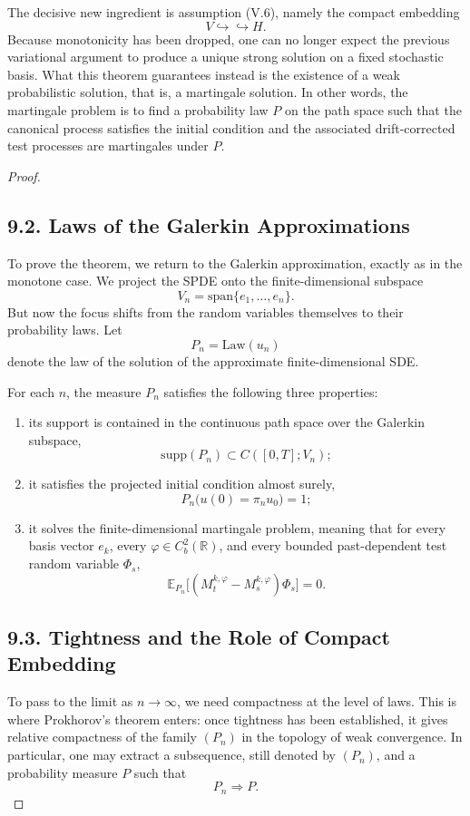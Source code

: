 \documentclass[11pt]{article}
\theoremstyle{definition}
\theoremstyle{remark}
\begin{document}
The decisive new ingredient is assumption (V.6), namely the compact embedding
\[
  V\hookrightarrow\hookrightarrow H.
\]
Because monotonicity has been dropped, one can no longer expect the previous variational argument to produce a unique strong solution on a fixed stochastic basis. What this theorem guarantees instead is the existence of a weak probabilistic solution, that is, a martingale solution.
In other words, the martingale problem is to find a probability law $P$ on the path space such that the canonical process satisfies the initial condition and the associated drift-corrected test processes are martingales under $P$.

\begin{proof}

\subsection*{9.2. Laws of the Galerkin Approximations}
To prove the theorem, we return to the Galerkin approximation, exactly as in the monotone case. We project the SPDE onto the finite-dimensional subspace
\[
  V_n=\mathrm{span}\{e_1,\dots,e_n\}.
\]
But now the focus shifts from the random variables themselves to their probability laws. Let
\[
  P_n=\mathrm{Law}(u_n)
\]
denote the law of the solution of the approximate finite-dimensional SDE.

For each $n$, the measure $P_n$ satisfies the following three properties:
\begin{enumerate}
\item its support is contained in the continuous path space over the Galerkin subspace,
\[
  \mathrm{supp}(P_n)\subset C([0,T];V_n);
\]
\item it satisfies the projected initial condition almost surely,
\[
  P_n\bigl(u(0)=\pi_n u_0\bigr)=1;
\]
\item it solves the finite-dimensional martingale problem, meaning that for every basis vector $e_k$, every $\varphi\in C_b^2(\mathbb{R})$, and every bounded past-dependent test random variable $\Phi_s$,
\[
  \mathbb E_{P_n}\bigl[(M_t^{k,\varphi}-M_s^{k,\varphi})\Phi_s\bigr]=0.
\]
\end{enumerate}

\subsection*{9.3. Tightness and the Role of Compact Embedding}
To pass to the limit as $n\to\infty$, we need compactness at the level of laws. This is where Prokhorov's theorem enters: once tightness has been established, it gives relative compactness of the family $(P_n)$ in the topology of weak convergence. In particular, one may extract a subsequence, still denoted by $(P_n)$, and a probability measure $P$ such that
\[
  P_n\Rightarrow P.
\]


\end{proof}
\end{document}
